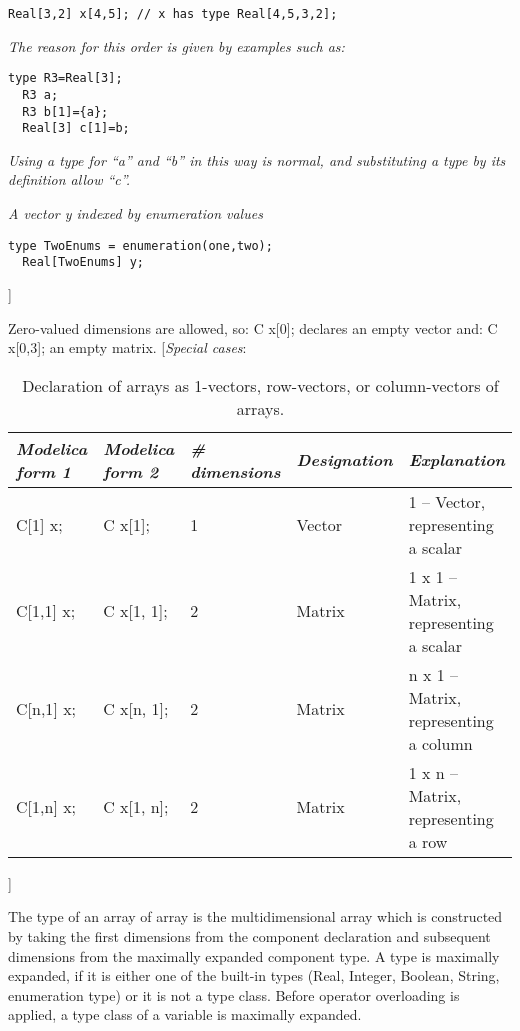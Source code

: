 \begin{lstlisting}[language=modelica]
  Real[3,2] x[4,5]; // x has type Real[4,5,3,2];
\end{lstlisting}
\emph{The reason for this order is given by examples such as:}

\begin{lstlisting}[language=modelica]
  type R3=Real[3];
  R3 a;
  R3 b[1]={a};
  Real[3] c[1]=b;
\end{lstlisting}
\emph{Using a type for ``a'' and ``b'' in this way is normal, and
substituting a type by its definition allow ``c''.}

\emph{A vector y indexed by enumeration values}

\begin{lstlisting}[language=modelica]
  type TwoEnums = enumeration(one,two);
  Real[TwoEnums] y;
\end{lstlisting}
{]}

Zero-valued dimensions are allowed, so: C x{[}0{]}; declares an empty
  vector and: C x{[}0,3{]}; an empty matrix.
{[}\emph{Special cases}:

\begin{longtable}{|l|l|l|l|p{3cm}|}
\caption{Declaration of arrays as 1-vectors, row-vectors, or
column-vectors of arrays.}\\
\hline
\emph{Modelica form 1} & \emph{Modelica form 2} & \emph{\# dimensions} &
\emph{Designation} & \emph{Explanation}\\ \hline
\endhead
C{[}1{]} x; & C x{[}1{]};  & 1 & Vector & 1 -- Vector, representing a scalar\\ \hline
C{[}1,1{]} x; & C x{[}1, 1{]}; & 2 & Matrix & 1 x 1 -- Matrix, representing a scalar\\ \hline
C{[}n,1{]} x; & C x{[}n, 1{]}; & 2 & Matrix & n x 1 -- Matrix, representing a column\\ \hline
C{[}1,n{]} x; & C x{[}1, n{]}; & 2 & Matrix & 1 x n -- Matrix, representing a row\\ \hline
\end{longtable}

{]}

The type of an array of array is the multidimensional array which is
constructed by taking the first dimensions from the component
declaration and subsequent dimensions from the maximally expanded
component type. A type is maximally expanded, if it is either one of the
built-in types (Real, Integer, Boolean, String, enumeration type) or it
is not a type class. Before operator overloading is applied, a type
class of a variable is maximally expanded.

